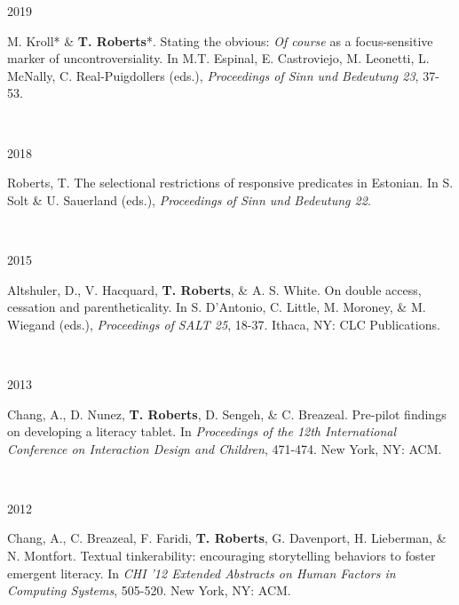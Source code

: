\documentclass[12pt]{article} %
\begin{document}
\begin{minipage}[t]{3cm}
2019
\end{minipage}
\begin{minipage}[t]{\smallertextwidth}
M. Kroll* \& \textbf{T. Roberts}*.  Stating the obvious: \emph{Of course} as a focus-sensitive marker of uncontroversiality. In M.T. Espinal, E. Castroviejo, M. Leonetti, L. McNally, C. Real-Puigdollers (eds.), \textit{Proceedings of Sinn und Bedeutung 23}, 37-53. \end{minipage}\\


\begin{minipage}[t]{3cm}
2018
\end{minipage}
\begin{minipage}[t]{\smallertextwidth}
Roberts, T. The selectional restrictions of responsive predicates in Estonian. In S. Solt \& U. Sauerland (eds.), \emph{Proceedings of Sinn und Bedeutung 22}. \end{minipage}\\

\begin{minipage}[t]{3cm}
2015
\end{minipage} \begin{minipage}[t]{\smallertextwidth}
Altshuler, D., V. Hacquard, \textbf{T. Roberts}, \& A. S. White. On double access, cessation and parentheticality. In S. D'Antonio, C. Little, M. Moroney, \& M. Wiegand (eds.), \textit{Proceedings of SALT 25}, 18-37. Ithaca, NY: CLC Publications.\end{minipage}\\

\begin{minipage}[t]{3cm}
2013
\end{minipage} \begin{minipage}[t]{\smallertextwidth}
Chang, A., D. Nunez, \textbf{T. Roberts}, D. Sengeh, \& C. Breazeal. Pre-pilot findings on developing a literacy tablet. In \emph{Proceedings of the 12th International Conference on Interaction Design and Children}, 471-474. New York, NY: ACM.\end{minipage}\\

\begin{minipage}[t]{3cm}
2012
\end{minipage} \begin{minipage}[t]{\smallertextwidth}
Chang, A., C. Breazeal, F. Faridi, \textbf{T. Roberts}, G. Davenport, H. Lieberman, \& N. Montfort. Textual tinkerability: encouraging storytelling behaviors to foster emergent literacy. In \emph{CHI '12 Extended Abstracts on Human Factors in Computing Systems}, 505-520. New York, NY: ACM.\end{minipage}\\
\end{document}
